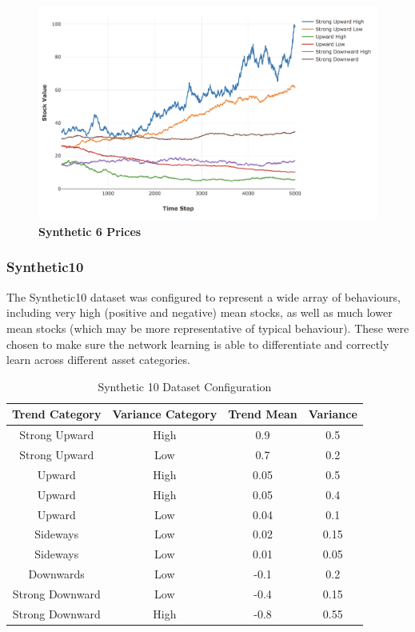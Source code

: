 \documentclass[a4paper,11pt,oneside]{article}
\theoremstyle{plain}
\theoremstyle{definition}
\begin{document}
	\begin{figure}[H]
		\centering
		\includegraphics[scale=0.35]{images/results/prices/synthetic6_prices.png} 
		\caption[Synthetic 6 Prices]{\textbf{Synthetic 6 Prices}}
		\label{figure-synthetic6_prices}
	\end{figure}
	
	\subsubsection{Synthetic10}\label{dataset_synthetic10}
	
	The Synthetic10 dataset was configured to represent a wide array of behaviours, including very high (positive and negative) mean stocks, as well as much lower mean stocks (which may be more representative of typical behaviour). These were chosen to make sure the network learning is able to differentiate and correctly learn across different asset categories.
	
	\begin{table}[H]
		\centering
		\begin{tabular}{|c|c|c|c|}
			\hline
			\textbf{Trend Category} &\textbf{Variance Category} & \textbf{Trend Mean} & \textbf{Variance}\\\hline	
			{Strong Upward} 		& {High} & {0.9} & {0.5} \\\hline
			{Strong Upward} 		& {Low} & {0.7} & {0.2} \\\hline
			{Upward} 					& {High} & {0.05} & {0.5} \\\hline
			{Upward} 					& {High} & {0.05} & {0.4} \\\hline
			{Upward} 					& {Low} & {0.04} & {0.1} \\\hline
			{Sideways} 					& {Low} & {0.02} & {0.15} \\\hline
			{Sideways}					& {Low} & {0.01} & {0.05} \\\hline
			{Downwards}				& {Low} & {-0.1} & {0.2} \\\hline
			{Strong Downward} 	& {Low} & {-0.4} & {0.15} \\\hline
			{Strong Downward}	& {High} & {-0.8} & {0.55} \\\hline
		\end{tabular}
		\newline\newline
		\caption{Synthetic 10 Dataset Configuration}\label{tab_synth10}
	\end{table}
	
\end{document}
